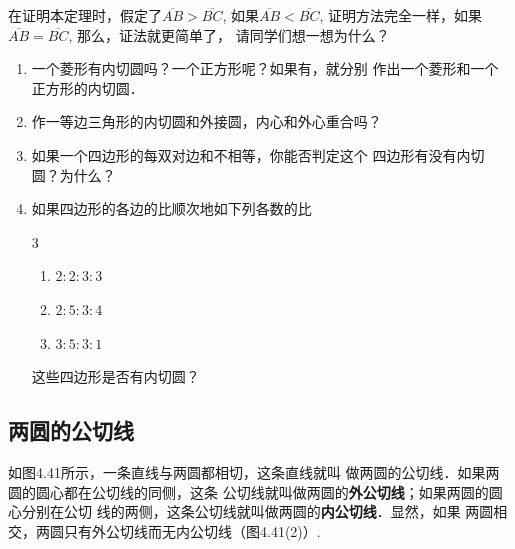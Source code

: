 \begin{rmk}
    在证明本定理时，假定了$\overline{AB}>\overline{BC}$, 如果$\overline{AB}<\overline{BC}$, 
证明方法完全一样，如果$\overline{AB}=\overline{BC}$, 那么，证法就更简单了，
请同学们想一想为什么？
\end{rmk}

\begin{ex}
\begin{enumerate}
    \item 一个菱形有内切圆吗？一个正方形呢？如果有，就分别
    作出一个菱形和一个正方形的内切圆．
    \item 作一等边三角形的内切圆和外接圆，内心和外心重合吗？
    \item 如果一个四边形的每双对边和不相等，你能否判定这个
    四边形有没有内切圆？为什么？
    \item 如果四边形的各边的比顺次地如下列各数的比
\begin{multicols}{3}
\begin{enumerate}
    \item $2:2:3:3$
    \item $2:5:3:4$
    \item $3:5:3:1$
\end{enumerate}
\end{multicols}
这些四边形是否有内切圆？
\end{enumerate}
\end{ex}

\subsection{两圆的公切线}
如图4.41所示，一条直线与两圆都相切，这条直线就叫
做两圆的公切线．如果两圆的圆心都在公切线的同侧，这条
公切线就叫做两圆的\textbf{外公切线}；如果两圆的圆心分别在公切
线的两侧，这条公切线就叫做两圆的\textbf{内公切线}．显然，如果
两圆相交，两圆只有外公切线而无内公切线（图4.41(2)）.

